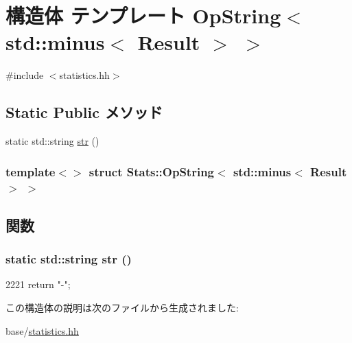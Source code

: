 \hypertarget{structStats_1_1OpString_3_01std_1_1minus_3_01Result_01_4_01_4}{
\section{構造体 テンプレート OpString$<$ std::minus$<$ Result $>$ $>$}
\label{structStats_1_1OpString_3_01std_1_1minus_3_01Result_01_4_01_4}
}


{\ttfamily \#include $<$statistics.hh$>$}\subsection*{Static Public メソッド}
\begin{DoxyCompactItemize}
\item 
static std::string \hyperlink{structStats_1_1OpString_3_01std_1_1minus_3_01Result_01_4_01_4_ac257b778f78be168137f5dc30893349b}{str} ()
\end{DoxyCompactItemize}
\subsubsection*{template$<$$>$ struct Stats::OpString$<$ std::minus$<$ Result $>$ $>$}



\subsection{関数}
\hypertarget{structStats_1_1OpString_3_01std_1_1minus_3_01Result_01_4_01_4_ac257b778f78be168137f5dc30893349b}{
\subsubsection[{str}]{\setlength{\rightskip}{0pt plus 5cm}static std::string str ()}}
\label{structStats_1_1OpString_3_01std_1_1minus_3_01Result_01_4_01_4_ac257b778f78be168137f5dc30893349b}



\begin{DoxyCode}
2221 { return "-"; }
\end{DoxyCode}


この構造体の説明は次のファイルから生成されました:\begin{DoxyCompactItemize}
\item 
base/\hyperlink{statistics_8hh}{statistics.hh}\end{DoxyCompactItemize}
